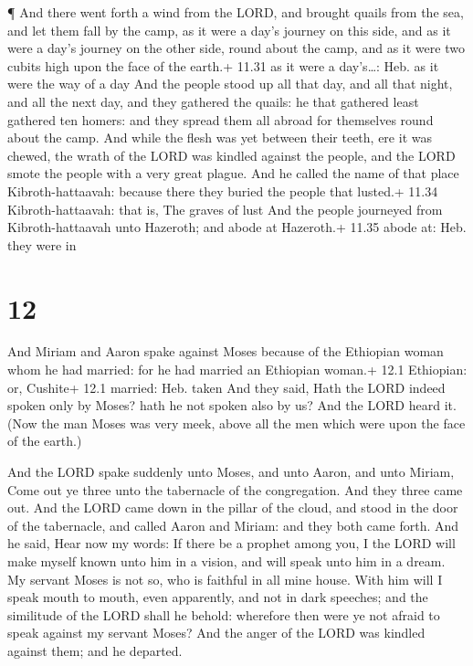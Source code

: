  ¶ And there went forth a wind from the LORD, and brought
quails from the sea, and let them fall by the camp, as it were a day's
journey on this side, and as it were a day's journey on the other side,
round about the camp, and as it were two cubits high upon the face of
the earth.+ 11.31 as it were a day's\ldots: Heb. as it were the way of a
day  And the people stood up all that day, and all that
night, and all the next day, and they gathered the quails: he that
gathered least gathered ten homers: and they spread them all abroad for
themselves round about the camp.  And while the flesh was
yet between their teeth, ere it was chewed, the wrath of the LORD was
kindled against the people, and the LORD smote the people with a very
great plague.  And he called the name of that place
Kibroth-hattaavah: because there they buried the people that lusted.+
11.34 Kibroth-hattaavah: that is, The graves of lust  And
the people journeyed from Kibroth-hattaavah unto Hazeroth; and abode at
Hazeroth.+ 11.35 abode at: Heb. they were in

\hypertarget{section-11}{%
\section{12}\label{section-11}}

 And Miriam and Aaron spake against Moses because of the
Ethiopian woman whom he had married: for he had married an Ethiopian
woman.+ 12.1 Ethiopian: or, Cushite+ 12.1 married: Heb. taken
 And they said, Hath the LORD indeed spoken only by Moses?
hath he not spoken also by us? And the LORD heard it.  (Now
the man Moses was very meek, above all the men which were upon the face
of the earth.)

 And the LORD spake suddenly unto Moses, and unto Aaron, and
unto Miriam, Come out ye three unto the tabernacle of the congregation.
And they three came out.  And the LORD came down in the
pillar of the cloud, and stood in the door of the tabernacle, and called
Aaron and Miriam: and they both came forth.  And he said,
Hear now my words: If there be a prophet among you, I the LORD will make
myself known unto him in a vision, and will speak unto him in a dream.
 My servant Moses is not so, who is faithful in all mine
house.  With him will I speak mouth to mouth, even
apparently, and not in dark speeches; and the similitude of the LORD
shall he behold: wherefore then were ye not afraid to speak against my
servant Moses?  And the anger of the LORD was kindled
against them; and he departed.

